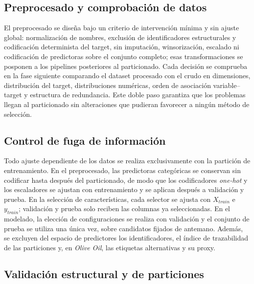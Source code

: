 \subsection{Preprocesado y comprobación de datos}

El preprocesado se diseña bajo un criterio de intervención mínima y
sin ajuste global: normalización de nombres, exclusión de
identificadores estructurales y codificación determinista del target,
sin imputación, winsorización, escalado ni codificación de predictoras
sobre el conjunto completo; esas transformaciones se posponen a los
pipelines posteriores al particionado. Cada decisión se comprueba en la
fase siguiente comparando el dataset procesado con el crudo en
dimensiones, distribución del target, distribuciones numéricas, orden
de asociación variable--target y estructura de redundancia. Este doble
paso garantiza que los problemas llegan al particionado sin
alteraciones que pudieran favorecer a ningún método de selección.

\subsection{Control de fuga de información}

Todo ajuste dependiente de los datos se realiza exclusivamente con la
partición de entrenamiento. En el preprocesado, las predictoras
categóricas se conservan sin codificar hasta después del particionado,
de modo que los codificadores \textit{one-hot} y los escaladores se
ajustan con entrenamiento y se aplican después a validación y prueba.
En la selección de características, cada selector se ajusta con
$X_{train}$ e $y_{train}$; validación y prueba solo reciben las
columnas ya seleccionadas. En el modelado, la elección de
configuraciones se realiza con validación y el conjunto de prueba se
utiliza una única vez, sobre candidatos fijados de antemano. Además,
se excluyen del espacio de predictores los identificadores, el índice
de trazabilidad de las particiones y, en \textit{Olive Oil}, las
etiquetas alternativas y su proxy.

\subsection{Validación estructural y de particiones}

